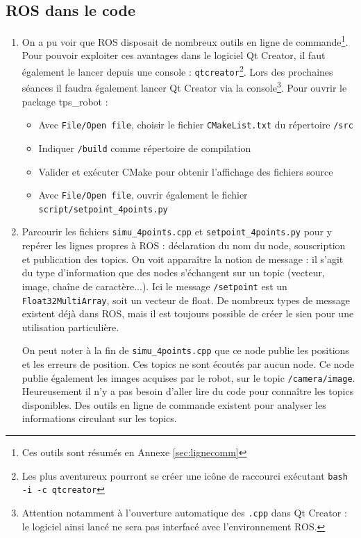 \documentclass[12pt,a4paper]{article}
\begin{document}
\subsection{ROS dans le code}
\begin{enumerate}
\item On a pu voir que ROS disposait de nombreux outils en ligne de commande\footnote{ Ces outils sont résumés en Annexe \ref{sec:lignecomm}}.
Pour pouvoir exploiter ces avantages dans le logiciel Qt Creator, il faut également le lancer depuis une console : \texttt{qtcreator}\footnote{Les plus aventureux pourront se créer une icône de raccourci exécutant \texttt{bash -i -c qtcreator}}.
Lors des prochaines séances il faudra également lancer Qt Creator via la console\footnote{ Attention notamment à l'ouverture automatique des \texttt{.cpp} dans Qt Creator : le logiciel ainsi lancé ne sera pas interfacé avec l'environnement ROS.}.
Pour ouvrir le package tps\_robot :
\begin{itemize}
\item Avec \texttt{File/Open file}, choisir le fichier \texttt{CMakeList.txt} du répertoire \texttt{\ros/src}
 \item Indiquer \texttt{\ros/build} comme répertoire de compilation
 \item Valider et exécuter CMake pour obtenir l'affichage des fichiers source
 \item Avec \texttt{File/Open file}, ouvrir également le fichier \texttt{script/setpoint\_4points.py}
\end{itemize}
\item Parcourir les fichiers \texttt{simu\_4points.cpp} et \texttt{setpoint\_4points.py} pour y repérer les lignes propres à ROS : déclaration du nom du node, souscription et publication des topics. On voit apparaître la notion de message : il s'agit du type d'information que des nodes s'échangent sur un topic (vecteur, image, chaîne de caractère...). Ici le message \texttt{/setpoint} est un \texttt{Float32MultiArray}, soit un vecteur de float. De nombreux types de message existent déjà dans ROS, mais il est toujours possible de créer le sien pour une utilisation particulière.

On peut noter à la fin de \texttt{simu\_4points.cpp} que ce node publie les positions et les erreurs de position. Ces topics ne sont écoutés par aucun node. 
Ce node publie également les images acquises par le robot, sur le topic \texttt{/camera/image}. 
Heureusement il n'y a pas besoin d'aller lire du code pour connaître les topics disponibles.
Des outils en ligne de commande existent pour analyser les informations circulant sur les topics.

\end{enumerate}
\end{document}
